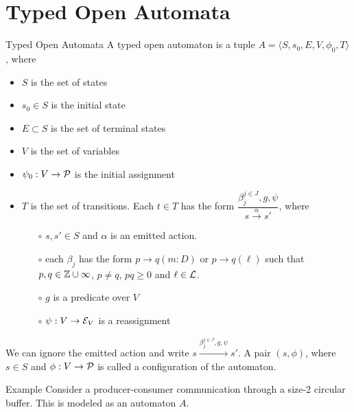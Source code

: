 \section{Typed Open Automata}
\begin{frame}{Typed Open Automata}
  A typed open automaton is a tuple $A=\langle S, s_0, E, V, \phi_0, T\rangle$, where
  \begin{itemize}
    \item $S$ is the set of states
    \item $s_0\in S$ is the initial state
    \item $E\subset S$ is the set of terminal states
    \item $V$ is the set of variables
    \item $\psi_0: V\to\P$ is the initial assignment
    \item $T$ is the set of transitions. Each $t\in T$ has the form $\dfrac{\beta_{j}^{j\in J}, g, \psi}{s\xrightarrow{\alpha}s'}$, where
          \begin{itemize}
            \item [$\circ$]$s,s'\in S$ and $\alpha$ is an emitted action.
            \item [$\circ$] each $\beta_{j}$ has the form $p\to q(m : D)$ or $p\to q(\ell)$ such that $p,q\in \ZZ\cup\infty$, $p\ne q$, $pq\ge0$ and $\ell\in\L$.
            \item [$\circ$] $g$ is a predicate over $V$
            \item [$\circ$] $\psi: V\to \E_V$ is a reassignment
          \end{itemize}
  \end{itemize}
  We can ignore the emitted action and write $s\xrightarrow{\beta_{j}^{j\in J}, g, \psi}s'$. A pair $(s, \phi)$, where $s\in S$ and $\phi:V\to\P$ is called a configuration of the automaton.
\end{frame}

\begin{frame}{Example}
  Consider a producer-consumer communication through a size-2 circular buffer. This is modeled as an automaton $A$.

  \begin{figure}[ht]
    \centering
  \end{figure}
\end{frame}

